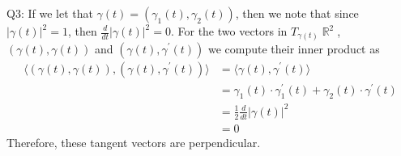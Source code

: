 \documentclass[letterpaper]{article}
\DeclareMathOperator{\R}{\mathbb{R}}
\newcommand{\lan}{\langle}
\newcommand{\ran}{\rangle}
\newcommand{\inn}[1]{\lan#1\ran}
\begin{document}
\noindent Q3: If we let that $\gamma(t) = (\gamma_1(t),\gamma_2(t))$, then we note that since $|\gamma(t)|^2=1$, then $\frac{d}{dt}|\gamma(t)|^2=0$. For the two vectors in $T_{\gamma(t)}\R^2$, $(\gamma(t),\gamma(t))$ and $(\gamma(t),\gamma^\prime(t))$ we compute their inner product as 
\begin{align*}
\inn{(\gamma(t),\gamma(t)),(\gamma(t),\gamma^\prime(t))} & = \inn{\gamma(t),\gamma^\prime(t)}
\\ & = \gamma_1(t)\cdot \gamma_1^\prime(t) + \gamma_2(t)\cdot \gamma^\prime(t)
\\ & = \frac{1}{2}\frac{d}{dt}|\gamma(t)|^2
\\ & =0
\end{align*}Therefore, these tangent vectors are perpendicular. 
\end{document}

